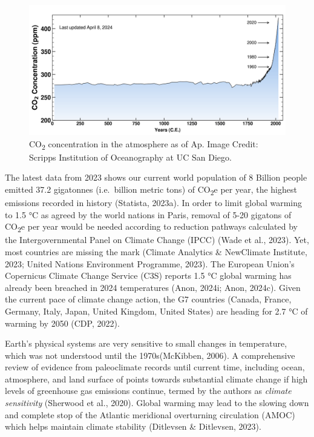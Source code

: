 \documentclass[
  letterpaper,
  DIV=11,
  numbers=noendperiod]{scrartcl}
\begin{document}
\begin{figure}[H]

{\centering \includegraphics{./images/sustainability/co2-concentration.png}

}

\caption{CO\textsubscript{2} concentration in the atmosphere as of Ap.
Image Credit: Scripps Institution of Oceanography at UC San Diego.}

\end{figure}%

The latest data from 2023 shows our current world population of 8
Billion people emitted 37.2 gigatonnes (i.e.~billion metric tons) of
CO\textsubscript{2}e per year, the highest emissions recorded in history
(Statista, 2023a). In order to limit global warming to 1.5 °C as agreed
by the world nations in Paris, removal of 5-20 gigatons of
CO\textsubscript{2}e per year would be needed according to reduction
pathways calculated by the Intergovernmental Panel on Climate Change
(IPCC) (Wade et al., 2023). Yet, most countries are missing the mark
(Climate Analytics \& NewClimate Institute, 2023; United Nations
Environment Programme, 2023). The European Union's Copernicus Climate
Change Service (C3S) reports 1.5 °C global warming has already been
breached in 2024 temperatures (Anon, 2024i; Anon, 2024c). Given the
current pace of climate change action, the G7 countries (Canada, France,
Germany, Italy, Japan, United Kingdom, United States) are heading for
2.7 °C of warming by 2050 (CDP, 2022).

Earth's physical systems are very sensitive to small changes in
temperature, which was not understood until the 1970s(McKibben, 2006). A
comprehensive review of evidence from paleoclimate records until current
time, including ocean, atmosphere, and land surface of points towards
substantial climate change if high levels of greenhouse gas emissions
continue, termed by the authors as \emph{climate sensitivity} (Sherwood
et al., 2020). Global warming may lead to the slowing down and complete
stop of the Atlantic meridional overturning circulation (AMOC) which
helps maintain climate stability (Ditlevsen \& Ditlevsen, 2023).
\end{document}
